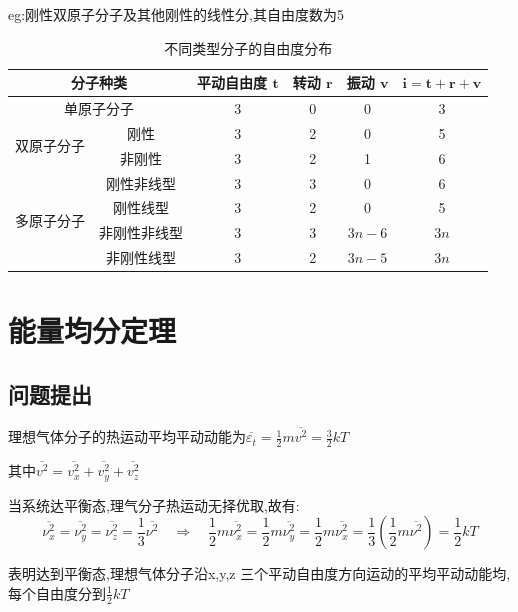 \documentclass{article}
\begin{document}
eg:刚性双原子分子及其他刚性的线性分,其自由度数为5


\begin{table}[htbp]
  \centering
  \setlength{\tabcolsep}{4pt}
  \renewcommand{\arraystretch}{1.1}
  \begin{tabular}{ccccc c}
    \toprule
    \multicolumn{2}{c}{分子种类} & 平动自由度 $\mathbf{t}$ & 转动 $\mathbf{r}$ & 振动 $\mathbf{v}$ & $\mathbf{i = t + r + v}$ \\
    \midrule
    \multicolumn{2}{c}{单原子分子} & 3 & 0 & 0 & 3 \\
    \midrule
    \multirow{2}{*}{双原子分子} & 刚性 & 3 & 2 & 0 & 5 \\
    & 非刚性 & 3 & 2 & 1 & 6 \\
    \midrule
    \multirow{4}{*}{多原子分子} & 刚性非线型 & 3 & 3 & 0 & 6 \\
    & 刚性线型 & 3 & 2 & 0 & 5 \\
    & 非刚性非线型 & 3 & 3 & $3n-6$ & $3n$ \\
    & 非刚性线型 & 3 & 2 & $3n-5$ & $3n$ \\
    \bottomrule
  \end{tabular}
  \caption{不同类型分子的自由度分布}
  \label{tab:molecular_degrees_of_freedom_booktabs}
\end{table}

\newpage

\section{能量均分定理}

\subsection{问题提出}

理想气体分子的热运动平均平动动能为$\overline{\varepsilon_t}=\frac{1}{2}m\overline{v^2}=\frac{3}{2}kT$

其中$\overline{v^2}=\overline{v_x^2}+\overline{v_y^2}+\overline{v_z^2}$

当系统达平衡态,理气分子热运动无择优取,故有:
$$\overline{\nu_x^2}=\overline{\nu_y^2}=\overline{\nu_z^2}=\frac{1}{3}\overline{\nu^2}\quad\Rightarrow\quad\frac{1}{2}m\overline{\nu_x^2}=\frac{1}{2}m\overline{\nu_y^2}=\frac{1}{2}m\overline{\nu_x^2}=\frac{1}{3}(\frac{1}{2}m\overline{\nu^2})=\frac{1}{2}kT$$

表明达到平衡态,理想气体分子沿x,y,z 三个平动自由度方向运动的平均平动动能均,每个自由度分到$\frac{1}{2}kT$
\end{document}
